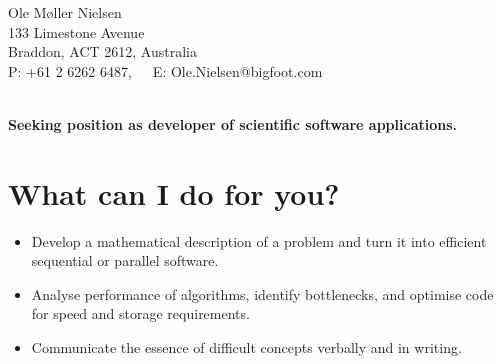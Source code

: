 \documentclass[12pt,a4paper]{article}
\begin{document}
\begin{center} 
  Ole M{\o}ller Nielsen \\
  133 Limestone Avenue \\
  Braddon, ACT 2612, Australia \\
  P: +61 2 6262 6487,\ \ \ E: Ole.Nielsen@bigfoot.com
\end{center}

\begin{center}
  \hrulefill \\
  {\bf \large Seeking position as developer of  
       scientific software applications.} \\[-0.2cm]
  \hrulefill        
\end{center}



\section*{What can I do for you?}
\begin{itemize} 
  \item Develop a mathematical description of a problem 
  and turn it into efficient sequential or parallel software.  
  \item Analyse performance of algorithms, identify bottlenecks,
  and optimise code for speed and storage requirements.
  \item Communicate the essence of difficult concepts verbally and in writing.
\end{itemize} 
\end{document}
